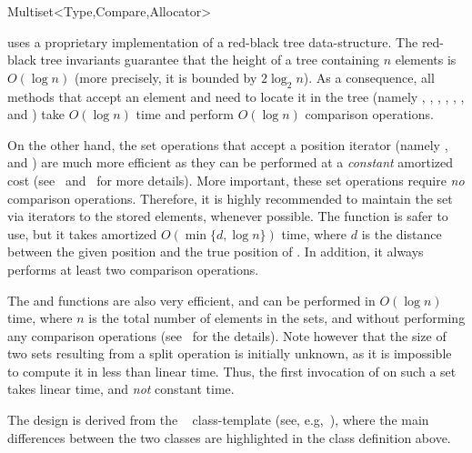\begin{ccRefClass}{Multiset<Type,Compare,Allocator>}
\begin{ccAdvanced}
\end{ccAdvanced}

\ccImplementation

 uses a proprietary implementation of a red-black tree
data-structure. The red-black tree invariants guarantee that the height of a 
tree containing $n$ elements is $O(\log{n})$ (more precisely, it is bounded by 
$2 \log_{2}{n}$). As a consequence, all methods that accept an element and need
to locate it in the tree (namely , , 
, ,  , ,
  and  ) take $O(\log{n})$ time and
perform $O(\log{n})$ comparison operations.

On the other hand, the set operations that accept a position iterator (namely
,  and )
are much more efficient as they can be performed at a {\em constant} amortized 
cost (see~\cite{gs-dfbt-78} and~\cite{t-dsna-83} for more details).
More important, these set operations require {\em no} comparison operations.
Therefore, it is highly recommended to maintain the set via iterators
to the stored elements, whenever possible. The function  
is safer to use, but it takes amortized $O(\min\{d,\log{n}\})$ time, where $d$
is the distance between the given position and the true position of . 
In addition, it always performs at least two comparison operations.

\begin{ccAdvanced}

The  and  functions are also very efficient, and
can be performed in $O(\log{n})$ time, where $n$ is the total number of
elements in the sets, and without performing any comparison operations
(see~\cite{t-dsna-83} for the details).
Note however that the size of two sets resulting from a split operation is
initially unknown, as it is impossible to compute it in less than linear time.
Thus, the first invocation of  on such a set takes linear time,
and {\em not} constant time.

\end{ccAdvanced}

The design is derived from the \stl\  class-template (see,
e.g,~\cite{cgal:ms-strg-96}), where the main differences between the two
classes are highlighted in the class definition above.

\end{ccRefClass}




